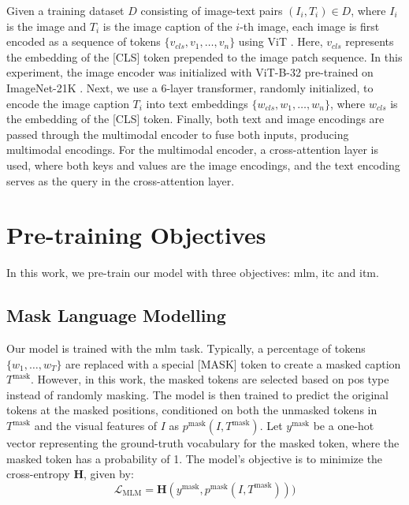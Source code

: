 Given a training dataset \(D\) consisting of image-text pairs \((I_i, T_i) \in D\), where \(I_i\) is the image and \(T_i\) is the image caption of the \(i\)-th image, each image is first encoded as a sequence of tokens \(\{v_{cls}, v_1, \dots, v_n\}\) using ViT \cite{vit}. 
Here, \(v_{cls}\) represents the embedding of the [CLS] token prepended to the image patch sequence. 
In this experiment, the image encoder was initialized with ViT-B-32 pre-trained on ImageNet-21K \cite{imagenet}.
Next, we use a 6-layer transformer, randomly initialized, to encode the image caption \(T_i\) into text embeddings \(\{w_{cls}, w_1, \dots, w_n\}\), where \(w_{cls}\) is the embedding of the [CLS] token. 
Finally, both text and image encodings are passed through the multimodal encoder to fuse both inputs, producing multimodal encodings. 
For the multimodal encoder, a cross-attention layer is used, where both keys and values are the image encodings, and the text encoding serves as the query in the cross-attention layer.


\section{Pre-training Objectives}
In this work, we pre-train our model with three objectives: \acrfull{mlm}, \acrfull{itc} and \acrfull{itm}.
\subsection{Mask Language Modelling}
Our model is trained with the \acrlong{mlm} task. 
Typically, a percentage of tokens \(\{w_1, \dots, w_T\}\) are replaced with a special [MASK] token to create a masked caption \(T^{\text{mask}}\). 
However, in this work, the masked tokens are selected based on \acrshort{pos} type instead of randomly masking. 
The model is then trained to predict the original tokens at the masked positions, conditioned on both the unmasked tokens in \(T^{\text{mask}}\) and the visual features of \(I\) as \(p^{\text{mask}}(I, T^{\text{mask}})\).
Let \(y^{\text{mask}}\) be a one-hot vector representing the ground-truth vocabulary for the masked token, where the masked token has a probability of 1. 
The model’s objective is to minimize the cross-entropy \(\mathbf{H}\), given by:
\[
    \mathcal{L}_{\text{MLM}} = \mathbf{H}(y^{\text{mask}}, p^{\text{mask}}(I, T^{\text{mask}})))
\]

